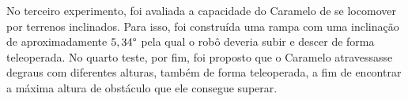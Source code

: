 \documentclass[../main.tex]{subfiles}
\begin{document}
  No terceiro experimento, foi avaliada a capacidade do Caramelo de se locomover por terrenos inclinados. Para isso, foi construída uma rampa com uma inclinação de aproximadamente $5,34\degree$ pela qual o robô deveria subir e descer de forma teleoperada. No quarto teste, por fim, foi proposto que o Caramelo atravessasse degraus com diferentes alturas, também de forma teleoperada, a fim de encontrar a máxima altura de obstáculo que ele consegue superar.
\end{document}
